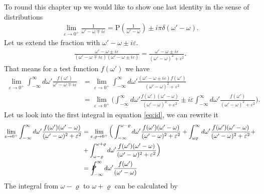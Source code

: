 \documentclass[a4paper]{article}
\begin{document}
To round this chapter up we would like to show one last identity in the sense
of distributions
\begin{align}
    \lim_{\varepsilon \rightarrow 0^+} \frac{1}{\omega' -\omega \mp
    i\varepsilon} = \text{P}(\frac{1}{\omega' - \omega}) \pm i\pi\delta(\omega'
    - \omega).
\end{align}
Let us extend the fraction with $\omega' - \omega \pm i\varepsilon$.
\begin{align}
\frac{\omega' - \omega \pm i\varepsilon}{(\omega' -\omega \mp
    i\varepsilon)(\omega' - \omega \pm i\varepsilon)} = \frac{\omega' - \omega
    \pm i\varepsilon}{(\omega' - \omega)^2 + \varepsilon^2}.
\end{align}
That means for a test function $f(\omega')$ we have
\begin{align}
    \lim_{\varepsilon \rightarrow 0^+} \int_{-\infty}^\infty d\omega'
    \frac{f(\omega')}{\omega' - \omega \mp i\varepsilon} &=
    \lim_{\varepsilon \rightarrow 0^+}
    \int_{-\infty}^\infty d\omega'
    \frac{(\omega' - \omega \pm i\varepsilon) f(\omega')}{(\omega' - \omega)^2
    + \varepsilon^2}\\
    & =
    \lim_{\varepsilon \rightarrow 0^+}\bigg(
    \int_{-\infty}^\infty d\omega'
    \frac{f(\omega')(\omega' - \omega )}{(\omega' - \omega)^2 + \varepsilon^2}
    \pm i\varepsilon
    \int_{-\infty}^\infty d\omega'\frac{f(\omega')}{(\omega' - \omega)^2 + \varepsilon^2}
    \bigg)\label{eq:id}.
\end{align}
Let us look into the first integral in equation \ref{eq:id}, we can rewrite it
\begin{align}
    \lim_{\varepsilon \rightarrow 0^+}\int_{-\infty}^\infty
    d\omega'\frac{f(\omega')(\omega' - \omega )}{(\omega' - \omega)^2 + \varepsilon^2}
    &= \lim_{\varepsilon,\varrho \rightarrow 0^+}
    \bigg(
        \int_{-\infty}^{\omega - \varrho}d\omega'\frac{f(\omega')(\omega' -
        \omega )}{(\omega' - \omega)^2 + \varepsilon^2}
        + \int_{\omega
        \varrho}^{\infty}d\omega'\frac{f(\omega')(\omega' - \omega )}{(\omega'
        - \omega)^2 + \varepsilon^2} + \\
        &+\int_{\omega -\varrho}^{\omega+
        \varrho}d\omega'\frac{f(\omega')(\omega' - \omega )}{(\omega' -
        \omega)^2 + \varepsilon^2}
        \bigg)
        \\
        &= \PV_{-\infty}^{\infty}d\omega' \frac{f(\omega')}{(\omega' - \omega)}
\end{align}
The integral from $\omega - \varrho$ to $\omega + \varrho$ can be calculated by
\end{document}
